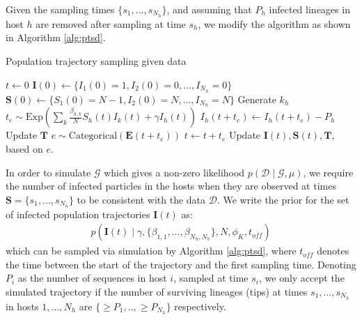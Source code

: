 \documentclass[]{report}
\begin{document}
Given the sampling times $\{s_1,...,s_{N_h}\}$, and assuming that $P_h$ infected lineages in host $h$  are removed after sampling at time $s_h$, we modify the algorithm as shown in Algorithm \ref{alg:ptsd}.
\begin{algorithm}
\caption{Population trajectory sampling given data \label{alg:ptsd}}
\begin{algorithmic}
\STATE $t\gets 0$
\STATE $\mathbf{I}(0)\gets\{I_1(0)=1, I_2(0)=0, ..., I_{N_h}=0\}$
\STATE $\mathbf{S}(0)\gets\{S_1(0)=N-1, I_2(0)=N, ..., I_{N_h}=N\}$
\STATE Generate $k_h$
\STATE $t_e \sim \textrm{Exp}(\sum_k \frac{\beta_{h,k}}{N}S_h(t)I_k(t) + \gamma I_h(t))$ 
{ 
\STATE $I_h(t+t_e)\gets I_h(t+t_e) - P_h$ 
\STATE Update $\mathbf{T}$
\ENDIF}
\ENDFOR
\STATE $e \sim \textrm{Categorical}(\mathbf{E}(t+t_e))$  
\STATE $t \gets t+t_e$
\STATE Update $\mathbf{I}(t), \mathbf{S}(t), \mathbf{T}$, based on $e$.
\ENDWHILE
\end{algorithmic}
\end{algorithm}
In order to simulate $\mathcal{G}$ which gives a non-zero likelihood $p(\mathcal{D}\mid \mathcal{G}, \mu)$, we require the number of infected particles in the hosts when they are observed at times $\mathbf{S}=\{s_1,...,s_{N_h}\}$ to be consistent with the data $\mathcal{D}$.  We write the prior for the set of infected population trajectories $\mathbf{I}(t)$ as:
\begin{eqnarray}
p(\mathbf{I}(t) \mid  \gamma, \{\beta_{1,1},...,\beta_{N_h,N_h}\}, N, \phi_K, t_{off})
\end{eqnarray}
which can be sampled via simulation by Algorithm \ref{alg:ptsd}, where $t_{off}$ denotes the time between the start of the trajectory and the first sampling time. Denoting $P_i$ as the number of sequences in host $i$, sampled at time $s_i$, we only accept the simulated trajectory if the number of surviving lineages (tips) at times $s_1,...,s_{N_h}$ in hosts $1,...,N_h$ are $\{ \geq P_1,..,\geq P_{N_h}\} $ respectively.
\end{document}
